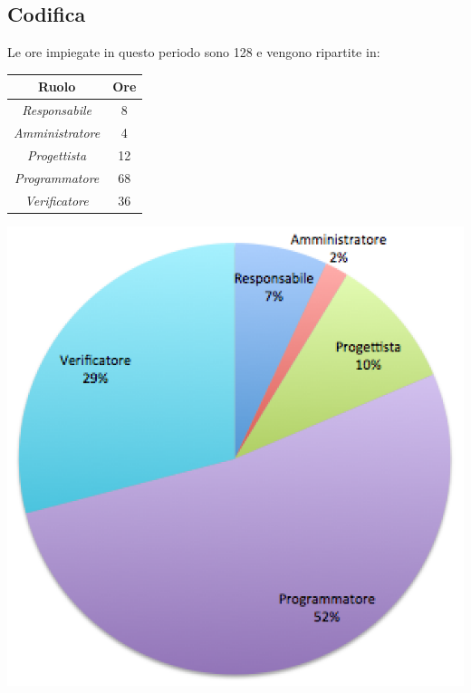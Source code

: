 \subsection{Codifica}
Le ore impiegate in questo periodo sono 128 e vengono ripartite in:
\begin{center}
  \centering
  \begin{tabular}{|c|c|}
    \hline
    \textbf{Ruolo} & \textbf{Ore} \\
    \hline
     \emph{Responsabile}  & 8 \\
    \hline  \emph{Amministratore}  & 4 \\
    \hline  \emph{Progettista}  & 12 \\
    \hline  \emph{Programmatore}  & 68 \\
    \hline  \emph{Verificatore}  & 36 \\
    \hline
  \end{tabular}
  \includegraphics[scale=0.7]{img/grafico5.png}
\end{center}

